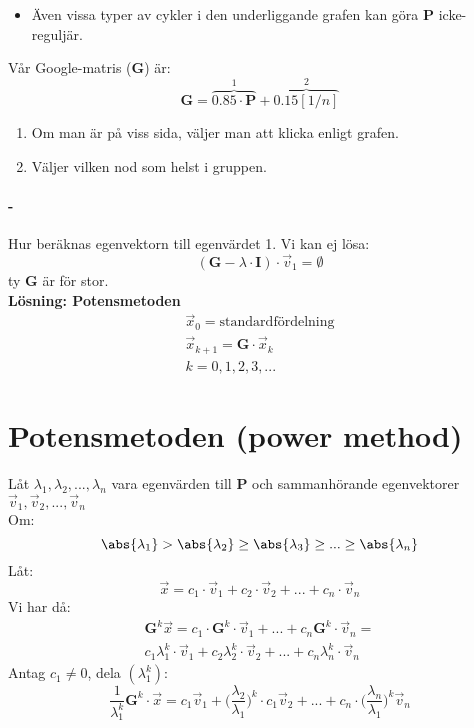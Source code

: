 \begin{itemize}
	\item Även vissa typer av cykler i den underliggande grafen kan göra \textbf{P} icke-reguljär.
\end{itemize}
Vår Google-matris ($\mathbf{G}$) är:
\[
    \mathbf{G} = \overbrace{0.85 \cdot \mathbf{P}}^1 + \overbrace{0.15 [1/n]}^2
\]
\begin{enumerate}
	\item Om man är på viss sida, väljer man att klicka enligt grafen.
	\item Väljer vilken nod som helst i gruppen.
\end{enumerate}
\paragraph{-} %
\label{par:_1}
Hur beräknas egenvektorn till egenvärdet 1.
Vi kan ej lösa:
\[
    (\mathbf{G} - \lambda \cdot \mathbf{I}) \cdot \vec{v}_1 = \emptyset
\]
ty \textbf{G} är för stor.\\
\textbf{Lösning: Potensmetoden}
\begin{gather*}
	\vec{x}_0 = \mbox{standardfördelning} \\
	\vec{x}_{k+1} = \mathbf{G} \cdot \vec{x}_k\\
	k = 0, 1, 2, 3, ...
\end{gather*}
\section{Potensmetoden (power method)} %
\label{sec:potensmetoden_}
Låt $\lambda_1, \lambda_2, ..., \lambda_n$ vara egenvärden till \textbf{P} och sammanhörande egenvektorer $\vec{v}_1, \vec{v}_2, ..., \vec{v}_n$\\
Om:
\[
    \abs{\lambda_1} > \abs{\lambda_2} \ge \abs{\lambda_3} \ge ... \ge \abs{\lambda_n}
\]
Låt:
\[
    \vec{x} = c_1 \cdot \vec{v}_1 + c_2 \cdot \vec{v}_2 + ... + c_n \cdot \vec{v}_n
\]
Vi har då:
\begin{gather*}
	\mathbf{G}^k \vec{x} = c_1 \cdot \mathbf{G}^k \cdot \vec{v}_1 + ... + c_n \mathbf{G}^k \cdot \vec{v}_n = \\
	c_1 \lambda_1^k \cdot \vec{v}_1 + c_2 \lambda_2^k \cdot \vec{v}_2 + ... + c_n \lambda_n^k \cdot \vec{v}_n
\end{gather*}
Antag $c_1 \neq 0$, dela $(\lambda_1^k)$:
\[
    \frac{1}{\lambda_1^k} \mathbf{G}^k \cdot \vec{x} = c_1 \vec{v}_1 + \Big(\frac{\lambda_2}{\lambda_1}\Big)^k \cdot c_1 \vec{v}_2 + ... + c_n \cdot \Big(\frac{\lambda_n}{\lambda_1}\Big)^k \vec{v}_n
\]
